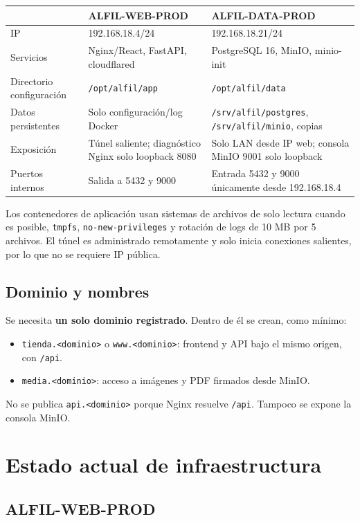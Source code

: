 \documentclass[11pt,a4paper]{article}
\newcommand{\code}[1]{\nolinkurl{#1}}
\begin{document}
\begin{tabularx}{\textwidth}{L{4.0cm}Y Y}
\toprule
 & \textbf{ALFIL-WEB-PROD} & \textbf{ALFIL-DATA-PROD}\\
\midrule
IP & 192.168.18.4/24 & 192.168.18.21/24\\
Servicios & Nginx/React, FastAPI, cloudflared & PostgreSQL 16, MinIO, minio-init\\
Directorio configuración & \code{/opt/alfil/app} & \code{/opt/alfil/data}\\
Datos persistentes & Solo configuración/log Docker & \code{/srv/alfil/postgres}, \code{/srv/alfil/minio}, copias\\
Exposición & Túnel saliente; diagnóstico Nginx solo loopback 8080 & Solo LAN desde IP web; consola MinIO 9001 solo loopback\\
Puertos internos & Salida a 5432 y 9000 & Entrada 5432 y 9000 únicamente desde 192.168.18.4\\
\bottomrule
\end{tabularx}

Los contenedores de aplicación usan sistemas de archivos de solo lectura cuando es posible, \code{tmpfs}, \code{no-new-privileges} y rotación de logs de 10 MB por 5 archivos. El túnel es administrado remotamente y solo inicia conexiones salientes, por lo que no se requiere IP pública.

\subsection{Dominio y nombres}

Se necesita \textbf{un solo dominio registrado}. Dentro de él se crean, como mínimo:
\begin{itemize}
  \item \code{tienda.<dominio>} o \code{www.<dominio>}: frontend y API bajo el mismo origen, con \code{/api}.
  \item \code{media.<dominio>}: acceso a imágenes y PDF firmados desde MinIO.
\end{itemize}

No se publica \code{api.<dominio>} porque Nginx resuelve \code{/api}. Tampoco se expone la consola MinIO.

\section{Estado actual de infraestructura}

\subsection{ALFIL-WEB-PROD}
\end{document}
